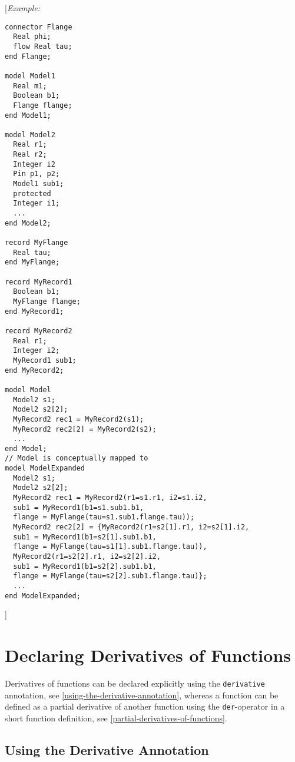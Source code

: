{[}\emph{Example:}

\begin{lstlisting}[language=modelica]
connector Flange
  Real phi;
  flow Real tau;
end Flange;

model Model1
  Real m1;
  Boolean b1;
  Flange flange;
end Model1;

model Model2
  Real r1;
  Real r2;
  Integer i2
  Pin p1, p2;
  Model1 sub1;
  protected
  Integer i1;
  ...
end Model2;

record MyFlange
  Real tau;
end MyFlange;

record MyRecord1
  Boolean b1;
  MyFlange flange;
end MyRecord1;

record MyRecord2
  Real r1;
  Integer i2;
  MyRecord1 sub1;
end MyRecord2;

model Model
  Model2 s1;
  Model2 s2[2];
  MyRecord2 rec1 = MyRecord2(s1);
  MyRecord2 rec2[2] = MyRecord2(s2);
  ...
end Model;
// Model is conceptually mapped to
model ModelExpanded
  Model2 s1;
  Model2 s2[2];
  MyRecord2 rec1 = MyRecord2(r1=s1.r1, i2=s1.i2,
  sub1 = MyRecord1(b1=s1.sub1.b1,
  flange = MyFlange(tau=s1.sub1.flange.tau));
  MyRecord2 rec2[2] = {MyRecord2(r1=s2[1].r1, i2=s2[1].i2,
  sub1 = MyRecord1(b1=s2[1].sub1.b1,
  flange = MyFlange(tau=s1[1].sub1.flange.tau)),
  MyRecord2(r1=s2[2].r1, i2=s2[2].i2,
  sub1 = MyRecord1(b1=s2[2].sub1.b1,
  flange = MyFlange(tau=s2[2].sub1.flange.tau)};
  ...
end ModelExpanded;
\end{lstlisting}
{]}

\section{Declaring Derivatives of Functions}

Derivatives of functions can be declared explicitly using the \lstinline!derivative!
annotation, see \autoref{using-the-derivative-annotation}, whereas a function can be defined as a
partial derivative of another function using the \lstinline!der!-operator in a short
function definition, see \autoref{partial-derivatives-of-functions}.

\subsection{Using the Derivative Annotation}

